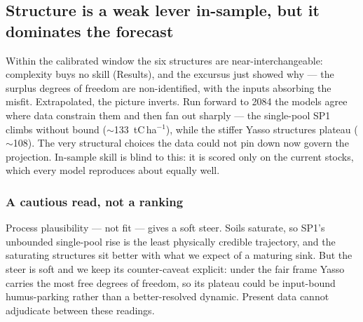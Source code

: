 \documentclass[11pt]{article}
\begin{document}
\subsection{Structure is a weak lever in-sample, but it dominates the forecast}
Within the calibrated window the six structures are near-interchangeable: complexity
buys no skill (Results), and the excursus just showed why --- the surplus degrees of
freedom are non-identified, with the inputs absorbing the misfit. Extrapolated, the
picture inverts. Run forward to 2084 the models agree where data constrain them and then
fan out sharply --- the single-pool SP1 climbs without bound ($\sim$133~tC\,ha$^{-1}$),
while the stiffer Yasso structures plateau ($\sim$108). The very structural choices the
data could not pin down now govern the projection. In-sample skill is blind to this: it
is scored only on the current stocks, which every model reproduces about equally well.

\subsubsection{A cautious read, not a ranking}
Process plausibility --- not fit --- gives a soft steer. Soils saturate, so SP1's
unbounded single-pool rise is the least physically credible trajectory, and the
saturating structures sit better with what we expect of a maturing sink. But the steer
is soft and we keep its counter-caveat explicit: under the fair frame Yasso carries the
most free degrees of freedom, so its plateau could be input-bound humus-parking rather
than a better-resolved dynamic. Present data cannot adjudicate between these readings.
\end{document}
